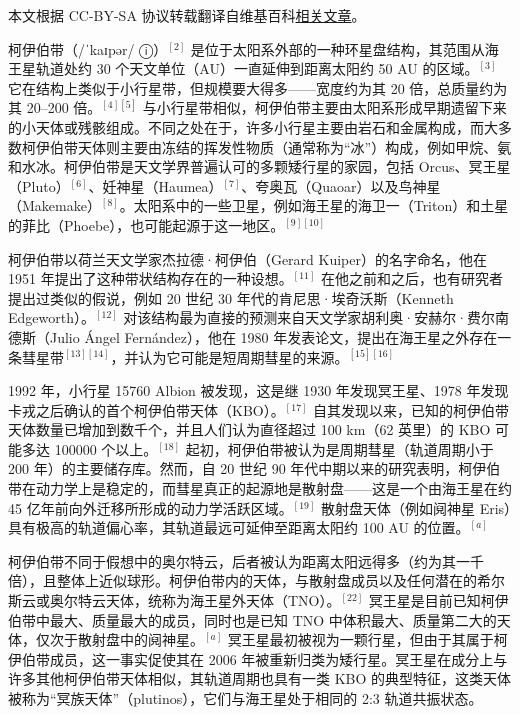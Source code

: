 
本文根据 CC-BY-SA 协议转载翻译自维基百科\href{https://en.wikipedia.org/wiki/Kuiper_belt}{相关文章}。

柯伊伯带（/ˈkaɪpər/ ⓘ）$^{[2]}$ 是位于太阳系外部的一种环星盘结构，其范围从海王星轨道处约 30 个天文单位（AU）一直延伸到距离太阳约 50 AU 的区域。$^{[3]}$ 它在结构上类似于小行星带，但规模要大得多——宽度约为其 20 倍，总质量约为其 20–200 倍。$^{[4][5]}$ 与小行星带相似，柯伊伯带主要由太阳系形成早期遗留下来的小天体或残骸组成。不同之处在于，许多小行星主要由岩石和金属构成，而大多数柯伊伯带天体则主要由冻结的挥发性物质（通常称为“冰”）构成，例如甲烷、氨和水冰。柯伊伯带是天文学界普遍认可的多颗矮行星的家园，包括 Orcus、冥王星（Pluto）$^{[6]}$、妊神星（Haumea）$^{[7]}$、夸奥瓦（Quaoar）以及鸟神星（Makemake）$^{[8]}$。太阳系中的一些卫星，例如海王星的海卫一（Triton）和土星的菲比（Phoebe），也可能起源于这一地区。$^{[9][10]}$

柯伊伯带以荷兰天文学家杰拉德·柯伊伯（Gerard Kuiper）的名字命名，他在 1951 年提出了这种带状结构存在的一种设想。$^{[11]}$ 在他之前和之后，也有研究者提出过类似的假说，例如 20 世纪 30 年代的肯尼思·埃奇沃斯（Kenneth Edgeworth）。$^{[12]}$ 对该结构最为直接的预测来自天文学家胡利奥·安赫尔·费尔南德斯（Julio Ángel Fernández），他在 1980 年发表论文，提出在海王星之外存在一条彗星带$^{[13][14]}$，并认为它可能是短周期彗星的来源。$^{[15][16]}$

1992 年，小行星 15760 Albion 被发现，这是继 1930 年发现冥王星、1978 年发现卡戎之后确认的首个柯伊伯带天体（KBO）。$^{[17]}$ 自其发现以来，已知的柯伊伯带天体数量已增加到数千个，并且人们认为直径超过 100 km（62 英里）的 KBO 可能多达 100000 个以上。$^{[18]}$ 起初，柯伊伯带被认为是周期彗星（轨道周期小于 200 年）的主要储存库。然而，自 20 世纪 90 年代中期以来的研究表明，柯伊伯带在动力学上是稳定的，而彗星真正的起源地是散射盘——这是一个由海王星在约 45 亿年前向外迁移所形成的动力学活跃区域。$^{[19]}$ 散射盘天体（例如阋神星 Eris）具有极高的轨道偏心率，其轨道最远可延伸至距离太阳约 100 AU 的位置。$^{[a]}$

柯伊伯带不同于假想中的奥尔特云，后者被认为距离太阳远得多（约为其一千倍），且整体上近似球形。柯伊伯带内的天体，与散射盘成员以及任何潜在的希尔斯云或奥尔特云天体，统称为海王星外天体（TNO）。$^{[22]}$ 冥王星是目前已知柯伊伯带中最大、质量最大的成员，同时也是已知 TNO 中体积最大、质量第二大的天体，仅次于散射盘中的阋神星。$^{[a]}$ 冥王星最初被视为一颗行星，但由于其属于柯伊伯带成员，这一事实促使其在 2006 年被重新归类为矮行星。冥王星在成分上与许多其他柯伊伯带天体相似，其轨道周期也具有一类 KBO 的典型特征，这类天体被称为“冥族天体”（plutinos），它们与海王星处于相同的 2:3 轨道共振状态。

